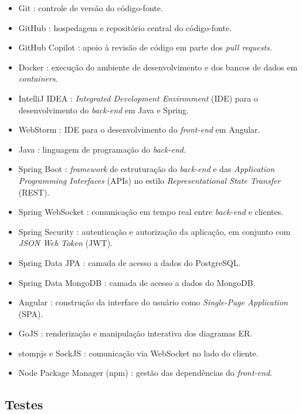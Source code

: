 \begin{itemize}
    \item Git \cite{Git2025}: controle de versão do código-fonte.
    \item GitHub \cite{GitHub2024}: hospedagem e repositório central do código-fonte.
    \item GitHub Copilot \cite{GitHubCopilot2026}: apoio à revisão de código em parte dos \textit{pull requests}.
    \item Docker \cite{Docker2024}: execução do ambiente de desenvolvimento e dos bancos de dados em \textit{containers}.
    \item IntelliJ IDEA \cite{IntelliJ2024}: \textit{Integrated Development Environment} (IDE) para o desenvolvimento do \textit{back-end} em Java e Spring.
    \item WebStorm \cite{WebStorm2024}: IDE para o desenvolvimento do \textit{front-end} em Angular.
    \item Java \cite{Java2024}: linguagem de programação do \textit{back-end}.
    \item Spring Boot \cite{SpringBoot2024}: \textit{framework} de estruturação do \textit{back-end} e das \textit{Application Programming Interfaces} (APIs) no estilo \textit{Representational State Transfer} (REST).
    \item Spring WebSocket \cite{WebSockets2024}: comunicação em tempo real entre \textit{back-end} e clientes.
    \item Spring Security \cite{SpringSecurity2024}: autenticação e autorização da aplicação, em conjunto com \textit{JSON Web Token} (JWT).
    \item Spring Data JPA \cite{SpringDataJPA2024}: camada de acesso a dados do PostgreSQL.
    \item Spring Data MongoDB \cite{SpringDataMongoDB2024}: camada de acesso a dados do MongoDB.
    \item Angular \cite{Angular2022}: construção da interface do usuário como \textit{Single-Page Application} (SPA).
    \item GoJS \cite{GoJS2024}: renderização e manipulação interativa dos diagramas ER.
    \item stompjs e SockJS \cite{StompJS2023}: comunicação via WebSocket no lado do cliente.
    \item Node Package Manager (npm) \cite{NPM2024}: gestão das dependências do \textit{front-end}.
\end{itemize}

\subsection[Testes]{Testes}
\label{subsec:testes}

